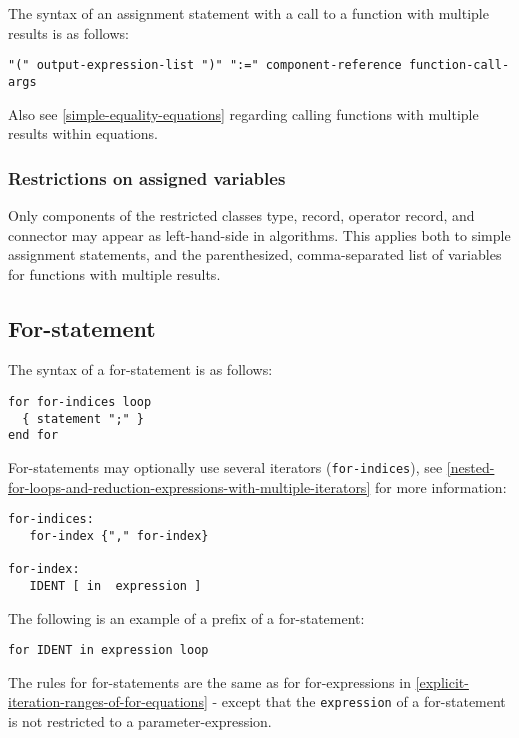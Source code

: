 The syntax of an assignment statement with a call to a function with
multiple results is as follows:
\begin{lstlisting}[language=grammar]
"(" output-expression-list ")" ":=" component-reference function-call-args
\end{lstlisting}

\begin{nonnormative}
Also see \cref{simple-equality-equations} regarding calling functions with
multiple results within equations.
\end{nonnormative}

\subsubsection{Restrictions on assigned variables}\label{restrictions-on-assigned-variables}
Only components of the restricted classes type, record, operator record, and connector may appear as left-hand-side in algorithms.
This applies both to simple assignment statements, and the parenthesized, comma-separated list of variables for functions with multiple results.

\subsection{For-statement}\label{for-statement}

The syntax of a for-statement is as follows:
\begin{lstlisting}[language=grammar]
for for-indices loop
  { statement ";" }
end for
\end{lstlisting}
For-statements may optionally use several iterators (\lstinline!for-indices!), see
\cref{nested-for-loops-and-reduction-expressions-with-multiple-iterators} for more information:
\begin{lstlisting}[language=grammar]
for-indices:
   for-index {"," for-index}

for-index:
   IDENT [ in  expression ]
\end{lstlisting}
The following is an example of a prefix of a for-statement:
\begin{lstlisting}[language=modelica]
for IDENT in expression loop
\end{lstlisting}
The rules for for-statements are the same as for for-expressions in \cref{explicit-iteration-ranges-of-for-equations} -
except that the \lstinline!expression! of a for-statement is not restricted to a parameter-expression.

